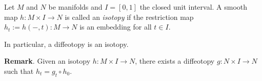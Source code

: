 \documentclass[12pt]{article}
\begin{document}
Let $M$ and $N$ be manifolds and $I=[0,1]$ the closed unit interval.  A smooth map $h\colon M\times I\to N$ is called an \emph{isotopy} if the restriction map $h_t:=h(-,t):M\to N$ is an embedding for all $t\in I$.

In particular, a diffeotopy is an isotopy.

\textbf{Remark}.  Given an isotopy $h\colon M\times I\to N$, there exists a diffeotopy $g\colon N\times I\to N$ such that $h_t=g_t\circ h_0$.
\end{document}
